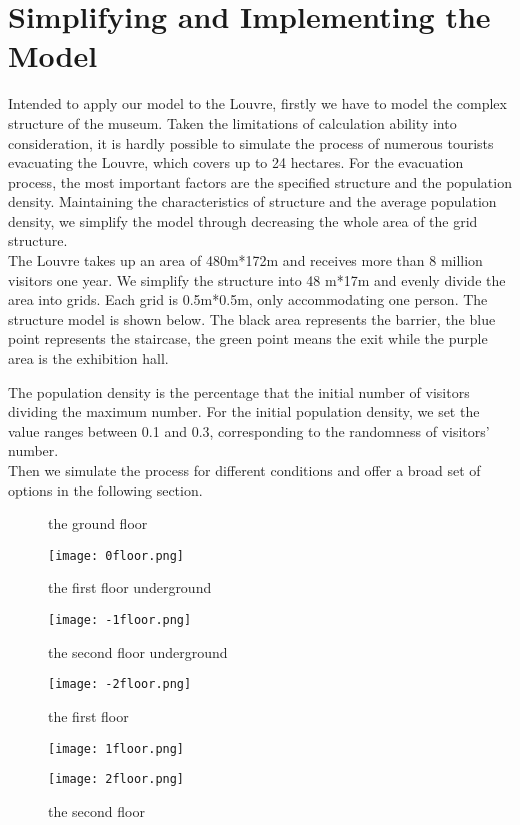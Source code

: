 \documentclass{mcmthesis}
\begin{document}
\section{Simplifying and Implementing the Model}
\noindent Intended to apply our model to the Louvre, firstly we have to model the complex structure of the museum. Taken the limitations of calculation ability into consideration, it is hardly possible to simulate the process of numerous tourists evacuating the Louvre, which covers up to 24 hectares. For the evacuation process, the most important factors are the specified structure and the population density. Maintaining the characteristics of structure and the average population density, we simplify the model through decreasing the whole area of the grid structure.\\
\indent The Louvre takes up an area of 480m*172m and receives more than 8 million visitors one year. We simplify the structure into 48 m*17m  and evenly divide the area into grids. Each grid is 0.5m*0.5m, only accommodating one person. The structure model is shown below. The black area represents the barrier, the blue point represents the staircase, the green point means the exit while the purple area is the exhibition hall.
\par\indent The population density is the percentage that the initial number of visitors dividing the maximum number. For the initial population density, we set the value ranges between 0.1 and 0.3, corresponding to the randomness of visitors' number. \\
\indent Then we simulate the process for different conditions and offer a broad set of options in the following section.
\begin{figure}[htbp]
	\centering
	\begin{minipage}[htbp]{10.0cm}
		\centering
		\caption{the ground floor}
		\texttt{[image: 0floor.png]}
	\end{minipage}
	\begin{minipage}[htbp]{10.0cm}
		\centering
		\caption{the first floor underground}
		\texttt{[image: -1floor.png]}
	\end{minipage}
	\begin{minipage}[htbp]{10.0cm}
		\centering
		\caption{the second floor underground}
		\texttt{[image: -2floor.png]}
	\end{minipage}
	\begin{minipage}[htbp]{10.0cm}
		\centering
		\caption{the first floor}
		\texttt{[image: 1floor.png]}
	\end{minipage}
	\begin{minipage}[htbp]{10.0cm}
		\centering
		\caption{the second floor}
		\texttt{[image: 2floor.png]}
	\end{minipage}
\end{figure}
\clearpage
\end{document}
